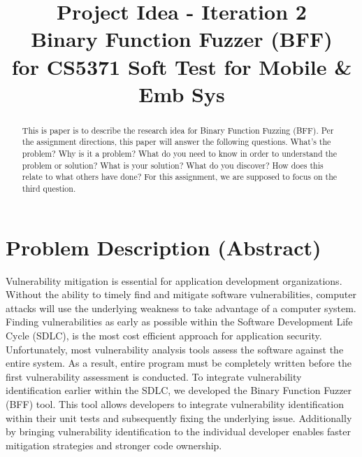 \documentclass[conference]{IEEEtran}
\begin{document}
\title{Project Idea - Iteration 2\\
Binary Function Fuzzer (BFF) \\
for CS5371 Soft Test for Mobile \& Emb Sys}

\author{
}

\maketitle

\begin{abstract}
This is paper is to describe the research idea for Binary Function Fuzzing (BFF). Per the assignment directions, this paper will answer the following questions. What's the problem? Why is it a problem? What do you need to know in order to understand the problem or solution?  What is your solution?  What do you discover?  How does this relate to what others have done? For this assignment, we are supposed to focus on the third question.
\end{abstract}

\IEEEpeerreviewmaketitle

\section{Problem Description (Abstract)}
Vulnerability mitigation is essential for application development organizations. Without the ability to timely find and mitigate software vulnerabilities, computer attacks will use the underlying weakness to take advantage of a computer system. Finding vulnerabilities as early as possible within the Software Development Life Cycle (SDLC), is the most cost efficient approach for application security. Unfortunately, most vulnerability analysis tools assess the software against the entire system. As a result, entire program must be completely written before the first vulnerability assessment is conducted. To integrate vulnerability identification earlier within the SDLC, we developed the Binary Function Fuzzer (BFF) tool. This tool allows developers to integrate vulnerability identification within their unit tests and subsequently fixing the underlying issue. Additionally by bringing vulnerability identification to the individual developer enables faster mitigation strategies and stronger code ownership. 
\end{document}
